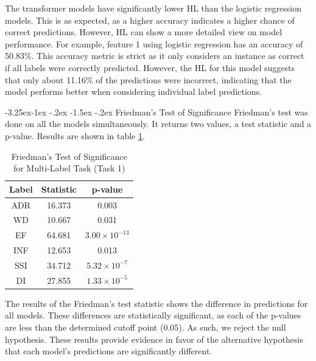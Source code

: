 \documentclass[10.7pt, onecolumn]{article}
\makeatletter
\renewcommand\subsubsection{\@startsection{subsubsection}{3}{\z@}%
	{-3.25ex\@plus -1ex \@minus -.2ex}%
    {-1.5ex \@plus -.2ex}%
    {\normalfont\itshape}}
\makeatother
\begin{document}
The transformer models have significantly lower HL than the logistic regression models. This is as expected, as a higher accuracy indicates a higher chance of correct predictions. However, HL can show a more detailed view on model performance. For example, feature 1 using logistic regression has an accuracy of 50.83\%. This accuracy metric is strict as it only considers an instance as correct if all labels were correctly predicted. However, the HL for this model suggests that only about 11.16\% of the predictions were incorrect, indicating that the model performs better when considering individual label predictions.

\subsubsection{Friedman's Test of Significance}
Friedman's test was done on all the models simultaneously. It returns two values, a test statistic and a p-value. Results are shown in table \ref{tab:friedmansTest}.

\begin{table}[H]
  \centering
  \small
  \begin{tabular}{|c|c|c|}
  \hline
  \textbf{Label} & \textbf{Statistic} & \textbf{p-value} \\ 
  \hline
  ADR & 16.373 & 0.003 \\ 
  \hline
  WD & 10.667 & 0.031 \\ 
  \hline
  EF & 64.681 & $3.00 \times 10^{-13}$ \\ 
  \hline
  INF & 12.653 & 0.013 \\ \hline
  SSI & 34.712 & $5.32 \times 10^{-7}$ \\ 
  \hline
  DI & 27.855 & $1.33 \times 10^{-5}$ \\ 
  \hline
  \end{tabular}
  \caption{Friedman's Test of Significance for Multi-Label Task (Task 1)}
  \label{tab:friedmansTest}
\end{table}

The results of the Friedman's test statistic shows the difference in predictions for all models. These differences are statistically significant, as each of the p-values are less than the determined cutoff point (0.05). As such, we reject the null hypothesis. These results provide evidence in favor of the alternative hypothesis that each model's predictions are significantly different.
\end{document}
